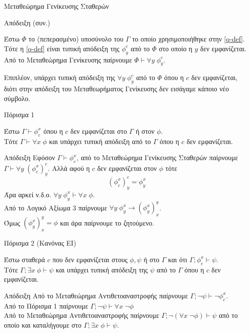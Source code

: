 \documentclass{beamer}
\begin{document}
\begin{frame}{Μεταθεώρημα Γενίκευσης Σταθερών}
  \begin{block}{Απόδειξη (συν.)}
  \end{block}
  \begin{block}{}
    Έστω $\Phi$ το (πεπερασμένο) υποσύνολο του $\Gamma$ το οποίο χρησιμοποιήθηκε στην \eqref{q-def}. Τότε η \eqref{q-def} είναι τυπική απόδειξη της $\phi_y^c$ από το $\Phi$ στο οποίο η $y$ δεν εμφανίζεται. Από το Μεταθεώρημα Γενίκευσης παίρνουμε $\Phi \vdash \forall y \; \phi_y^c$.
  \end{block}
  \begin{block}{}
  Επιπλέον, υπάρχει τυπική απόδειξη της $\forall y \; \phi_y^c$ από το $\Phi$ όπου η $c$ δεν εμφανίζεται, διότι στην απόδειξη του Μεταθεωρήματος Γενίκευσης δεν εισάγαμε κάποιο νέο σύμβολο.
  \end{block}
\end{frame}

\begin{frame}{Πόρισμα 1}
  \begin{block}{}
    Έστω $\Gamma \vdash \phi_c^x$ όπου η $c$ δεν εμφανίζεται στο $\Gamma$ ή στον $\phi$.\\
    Τότε $\Gamma \vdash \forall x \; \phi$ και υπάρχει τυπική απόδειξη από το $\Gamma$ όπου η $c$ δεν εμφανίζεται.
  \end{block}
  \begin{block}{Απόδειξη}
    Εφόσον $\Gamma \vdash \phi_c^x$, από το Μεταθεώρημα Γενίκευσης Σταθερών παίρνουμε $\Gamma \vdash \forall y \; (\phi_c^x)_y^c$. Αλλά αφού η $c$ δεν εμφανίζεται στον $\phi$ τότε
    \[
      (\phi_c^x)_y^c = \phi_y^x
    \]
    Άρα αρκεί ν.δ.ο. $\forall y \; \phi_y^x \vdash \forall x \; \phi$.\\
    Από το Λογικό Αξίωμα 3 παίρνουμε $\forall y \; \phi_y^x \rightarrow (\phi_y^x)_x^y$.\\
    Όμως $(\phi_y^x)_x^y = \phi$ και άρα παίρνουμε το ζητούμενο.
  \end{block}
\end{frame}

\begin{frame}{Πόρισμα 2 (Κανόνας EI)}
  \begin{block}{}
    Έστω σταθερά $c$ που δεν εμφανίζεται στους $\phi, \psi$ ή στο $\Gamma$ και ότι $\Gamma ; \phi_c^x \vdash \psi$.\\
    Τότε $\Gamma ; \exists x \; \phi \vdash \psi$ και υπάρχει τυπική απόδειξη της $\psi$ από το $\Gamma$ όπου η $c$ δεν εμφανίζεται.
  \end{block}
  \begin{block}{Απόδειξη}
    Από το Μεταθεώρημα Αντιθετοαναστροφής παίρνουμε $\Gamma ; \neg\psi \vdash \neg\phi_c^x$.\\
    Από το Πόρισμα 1 παίρνουμε $\Gamma ; \neg\psi \vdash \forall x \; \neg\phi$\\
    Από το Μεταθεώρημα Αντιθετοαναστροφής παίρνουμε $\Gamma ; \neg(\forall x \; \neg\phi) \vdash \psi$ από το οποίο και καταλήγουμε στο $\Gamma ; \exists x \; \phi \vdash \psi$.
  \end{block}
\end{frame}
\end{document}
